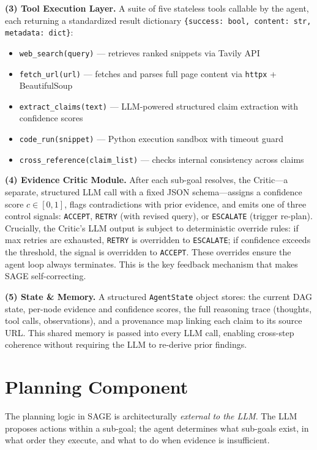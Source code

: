 \documentclass[11pt]{article}
\begin{document}
\textbf{(3) Tool Execution Layer.}
A suite of five stateless tools callable by the agent, each returning a standardized result dictionary \texttt{\{success: bool, content: str, metadata: dict\}}:
\begin{itemize}[leftmargin=1.5em, itemsep=1pt]
  \item \texttt{web\_search(query)} --- retrieves ranked snippets via Tavily API
  \item \texttt{fetch\_url(url)} --- fetches and parses full page content via \texttt{httpx} + BeautifulSoup
  \item \texttt{extract\_claims(text)} --- LLM-powered structured claim extraction with confidence scores
  \item \texttt{code\_run(snippet)} --- Python execution sandbox with timeout guard
  \item \texttt{cross\_reference(claim\_list)} --- checks internal consistency across claims
\end{itemize}

\textbf{(4) Evidence Critic Module.}
After each sub-goal resolves, the Critic---a separate, structured LLM call with a fixed
JSON schema---assigns a confidence score $c \in [0,1]$, flags contradictions with prior
evidence, and emits one of three control signals: \texttt{ACCEPT}, \texttt{RETRY} (with
revised query), or \texttt{ESCALATE} (trigger re-plan). Crucially, the Critic's LLM output is subject to deterministic override rules: if max retries are exhausted, \texttt{RETRY} is overridden to \texttt{ESCALATE}; if confidence exceeds the threshold, the signal is overridden to \texttt{ACCEPT}. These overrides ensure the agent loop always terminates. This is the key feedback
mechanism that makes SAGE self-correcting.

\textbf{(5) State \& Memory.}
A structured \texttt{AgentState} object stores: the current DAG state, per-node evidence and confidence
scores, the full reasoning trace (thoughts, tool calls, observations), and a provenance
map linking each claim to its source URL. This shared memory is passed into every LLM call,
enabling cross-step coherence without requiring the LLM to re-derive prior findings.

\section{Planning Component}

\begin{tcolorbox}[boxstyle, title={Core Planning Design}]
The planning logic in SAGE is architecturally \emph{external to the LLM}. The LLM
proposes actions within a sub-goal; the agent determines what sub-goals exist, in what
order they execute, and what to do when evidence is insufficient.
\end{tcolorbox}
\end{document}
